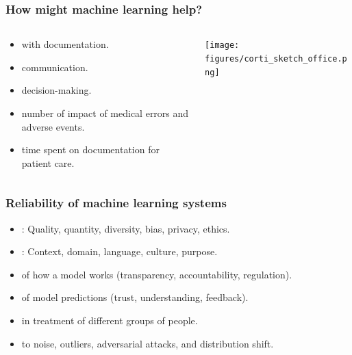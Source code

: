 \begin{frame}
    \frametitle{How might machine learning help?}
    \begin{columns}
        \begin{column}{0.35\textwidth}
            \begin{itemize}
                \item <1->  with documentation.
                \item <1->  communication.
                \item <1->  decision-making.
                \vspace{1em}
                \item <2->  number of impact of medical errors and adverse events.
                \item <2->  time spent on documentation for patient care.
            \end{itemize}
        \end{column}
        \begin{column}{0.65\textwidth}
            \centering
            \texttt{[image: figures/corti\_sketch\_office.png]}
        \end{column}
    \end{columns}
\end{frame}


\begin{frame}
    \frametitle{Reliability of machine learning systems}
    \begin{itemize}
        \item <1-> : Quality, quantity, diversity, bias, privacy, ethics.
        \item <2-> : Context, domain, language, culture, purpose.
        \vspace{1em}
        \item <3->  of how a model works (transparency, accountability, regulation).
        \item <4->  of model predictions (trust, understanding, feedback).
        \item <5->  in treatment of different groups of people.
        \item <6->  to noise, outliers, adversarial attacks, and distribution shift.
    \end{itemize}
\end{frame}

